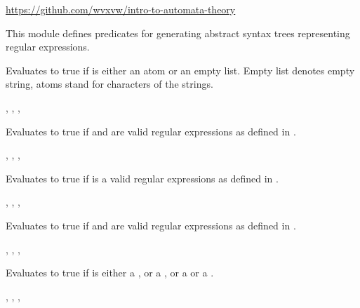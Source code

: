 \begin{tags}
\url{https://github.com/wvxvw/intro-to-automata-theory}
\end{tags}

This module defines predicates for generating abstract syntax trees
representing regular expressions.\vspace{0.7cm}

\begin{description}
Evaluates to true if  is either an atom or an empty list.
Empty list denotes empty string, atoms stand for characters of
the strings.

\begin{tags}
, , , 
\end{tags}

Evaluates to true if  and  are valid regular expressions
as defined in .

\begin{tags}
, , , 
\end{tags}

Evaluates to true if  is a valid regular expressions
as defined in .

\begin{tags}
, , , 
\end{tags}

Evaluates to true if  and  are valid regular expressions
as defined in .

\begin{tags}
, , , 
\end{tags}

Evaluates to true if  is either a , or a , or
a  or a .

\begin{tags}
, , , 
\end{tags}
\end{description}

